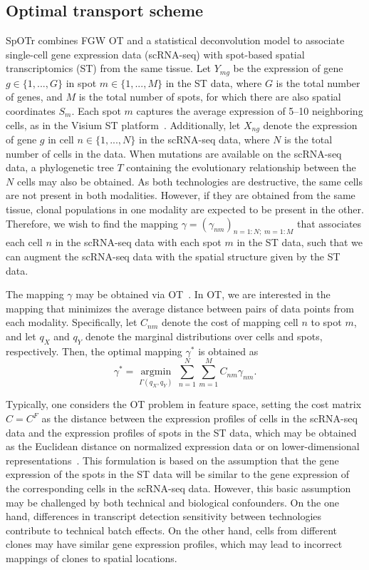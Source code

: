 \documentclass{article}
\newcommand{\toolnamex}{SpOTr }
\begin{document}
\subsection*{Optimal transport scheme}
\toolnamex combines FGW OT and a statistical deconvolution model to associate single-cell gene expression data (scRNA-seq) with spot-based spatial transcriptomics (ST) from the same tissue. Let $Y_{mg}$ be the expression of gene $g \in \{1,...,G\}$ in spot $m \in \{1,...,M\}$ in the ST data, where $G$ is the total number of genes, and $M$ is the total number of spots, for which there are also spatial coordinates $S_{m}$. Each spot $m$ captures the average expression of 5–10 neighboring cells, as in the Visium ST platform~\cite{stahl_visualization_2016}. Additionally, let $X_{ng}$ denote the expression of gene $g$ in cell $n \in \{1,...,N\}$ in the scRNA-seq data, where $N$ is the total number of cells in the data. When mutations are available on the scRNA-seq data, a phylogenetic tree $T$ containing the evolutionary relationship between the $N$ cells may also be obtained. As both technologies are destructive, the same cells are not present in both modalities. However, if they are obtained from the same tissue, clonal populations in one modality are expected to be present in the other. Therefore, we wish to find the mapping $\gamma = (\gamma_{nm})_{n=1:N;\; m=1:M}$ that associates each cell $n$ in the scRNA-seq data with each spot $m$ in the ST data, such that we can augment the scRNA-seq data with the spatial structure given by the ST data.

The mapping $\gamma$ may be obtained via OT~\cite{peyre_computational_2020}. In OT, we are interested in the mapping that minimizes the average distance between pairs of data points from each modality. Specifically, let $C_{nm}$ denote the cost of mapping cell $n$ to spot $m$, and let $q_X$ and $q_Y$ denote the marginal distributions over cells and spots, respectively. Then, the optimal mapping $\gamma^*$ is obtained as
\begin{equation}
\label{eq:ot}
    \gamma^* = \operatorname*{argmin}_{ \Gamma(q_X, q_Y)}\, 
    \sum_{n=1}^N \sum_{m=1}^M C_{nm}\gamma_{nm}.
\end{equation}

Typically, one considers the OT problem in feature space, setting the cost matrix $C=C^F$ as the distance between the expression profiles of cells in the scRNA-seq data and the expression profiles of spots in the ST data, which may be obtained as the Euclidean distance on normalized expression data or on lower-dimensional representations~\cite{bunne2024optimal}. This formulation is based on the assumption that the gene expression of the spots in the ST data will be similar to the gene expression of the corresponding cells in the scRNA-seq data. However, this basic assumption may be challenged by both technical and biological confounders. On the one hand, differences in transcript detection sensitivity between technologies contribute to technical batch effects. On the other hand, cells from different clones may have similar gene expression profiles, which may lead to incorrect mappings of clones to spatial locations.
\end{document}
